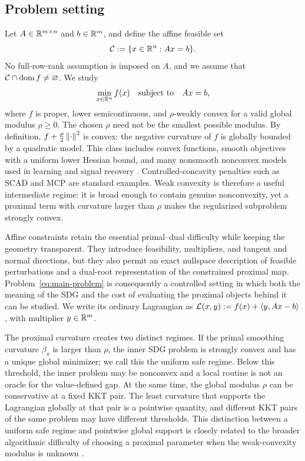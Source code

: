 \subsection{Problem setting}
\label{subsec:problem-setting}

Let \(A\in\mathbb{R}^{m\times n}\) and \(b\in\mathbb{R}^m\), and define the affine feasible
set
\[
  \mathcal{C}:=\{x\in\mathbb{R}^n:Ax=b\}.
\]
No full-row-rank assumption is imposed on \(A\), and we assume that
\(\mathcal{C}\cap\operatorname{dom}f\ne\varnothing\).  We study
\begin{equation}
  \min_{x\in\mathbb{R}^n} f(x)
  \quad\text{subject to}\quad
  Ax=b,
  \label{eq:main-problem}
\end{equation}
where \(f\) is proper, lower semicontinuous, and \(\rho\)-weakly convex for a
valid global modulus \(\rho\ge0\).  The chosen \(\rho\) need not be the
smallest possible modulus.  By definition,
\(f+\frac{\rho}{2}\left\lVert \cdot\right\rVert^{2}\) is convex: the negative curvature of
\(f\) is globally bounded by a quadratic model.  This class includes convex
functions, smooth objectives with a uniform lower Hessian bound, and many
nonsmooth nonconvex models used in learning and signal recovery
\cite{DavisDrusvyatskiy2019}.  Controlled-concavity penalties such as SCAD
\cite{FanLi2001} and MCP \cite{Zhang2010} are standard examples.  Weak
convexity is therefore a useful intermediate regime: it is broad enough to
contain genuine nonconvexity, yet a proximal term with curvature larger than
\(\rho\) makes the regularized subproblem strongly convex.

Affine constraints retain the essential primal--dual difficulty while
keeping the geometry transparent.  They introduce feasibility, multipliers,
and tangent and normal directions, but they also permit an exact nullspace
description of feasible perturbations and a dual-root representation of the
constrained proximal map.  Problem~\eqref{eq:main-problem} is consequently a
controlled setting in which both the meaning of the SDG and the cost of
evaluating the proximal objects behind it can be studied.  We write its
ordinary Lagrangian as
\(\mathcal{L}(x,y):=f(x)+\left\langle y,Ax-b\right\rangle\), with multiplier \(y\in\mathbb{R}^m\).

The proximal curvature creates two distinct regimes.  If the primal
smoothing curvature \(\beta_x\) is larger than \(\rho\), the inner SDG
problem is strongly convex and has a unique global minimizer; we call this
the uniform safe regime.  Below this threshold, the inner problem may be
nonconvex and a local routine is not an oracle for the value-defined gap.
At the same time, the global modulus
\(\rho\) can be conservative at a fixed KKT pair.  The least curvature that
supports the Lagrangian globally at that pair is a pointwise quantity, and
different KKT pairs of the same problem may have different thresholds.  This
distinction between a uniform safe regime and pointwise global support is
closely related to the broader algorithmic difficulty of choosing a proximal
parameter when the weak-convexity modulus is unknown
\cite{Xie2026}.

